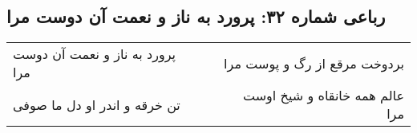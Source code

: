 \begin{center}
\section*{رباعی شماره ۳۲: پرورد به ناز و نعمت آن دوست مرا}
\label{sec:0032}
\begin{longtable}{l p{0.5cm} r}
پرورد به ناز و نعمت آن دوست مرا
&&
بردوخت مرقع از رگ و پوست مرا
\\
تن خرقه و اندر او دل ما صوفی
&&
عالم همه خانقاه و شیخ اوست مرا
\\
\end{longtable}
\end{center}

